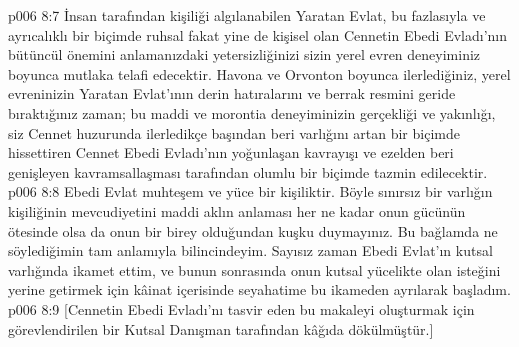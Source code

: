 \vs p006 8:7 İnsan tarafından kişiliği algılanabilen Yaratan Evlat, bu fazlasıyla ve ayrıcalıklı bir biçimde ruhsal fakat yine de kişisel olan Cennetin Ebedi Evladı’nın bütüncül önemini anlamanızdaki yetersizliğinizi sizin yerel evren deneyiminiz boyunca mutlaka telafi edecektir. Havona ve Orvonton boyunca ilerlediğiniz, yerel evreninizin Yaratan Evlat’ının derin hatıralarını ve berrak resmini geride bıraktığınız zaman; bu maddi ve morontia deneyiminizin gerçekliği ve yakınlığı, siz Cennet huzurunda ilerledikçe başından beri varlığını artan bir biçimde hissettiren Cennet Ebedi Evladı’nın yoğunlaşan kavrayışı ve ezelden beri genişleyen kavramsallaşması tarafından olumlu bir biçimde tazmin edilecektir.
\vs p006 8:8 Ebedi Evlat muhteşem ve yüce bir kişiliktir. Böyle sınırsız bir varlığın kişiliğinin mevcudiyetini maddi aklın anlaması her ne kadar onun gücünün ötesinde olsa da onun bir birey olduğundan kuşku duymayınız. Bu bağlamda ne söylediğimin tam anlamıyla bilincindeyim. Sayısız zaman Ebedi Evlat’ın kutsal varlığında ikamet ettim, ve bunun sonrasında onun kutsal yücelikte olan isteğini yerine getirmek için kâinat içerisinde seyahatime bu ikameden ayrılarak başladım.
\vs p006 8:9 [Cennetin Ebedi Evladı’nı tasvir eden bu makaleyi oluşturmak için görevlendirilen bir Kutsal Danışman tarafından kâğıda dökülmüştür.]
